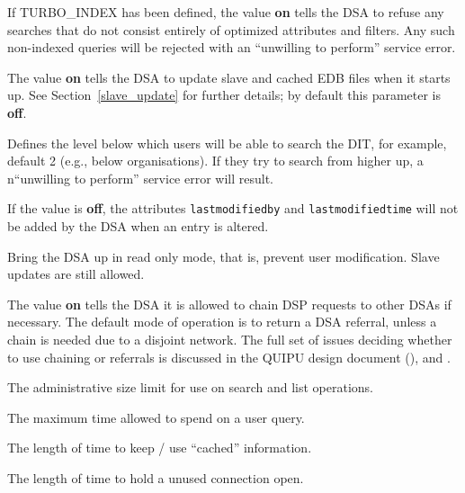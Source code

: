 \begin{describe}
\item [\verb"optimized\_only":]
If TURBO\_INDEX has been defined, the value {\bf on}
tells the DSA to refuse any searches that do not consist entirely of 
optimized attributes and filters.  Any such non-indexed queries
will be rejected with an ``unwilling to perform'' service error.

\item [\verb"update":]
The value {\bf on} tells the DSA to update slave and cached EDB files 
when it starts up.
See Section~\ref{slave_update} for further details; by default 
this parameter is {\bf off}.

\item [\verb"searchlevel":] Defines the level below which users will be able
to search the DIT, for example, default 2 (e.g., below organisations).
If they try to search from higher up, a n``unwilling to perform'' service
error will result.

\item [\verb"lastmodified":] If the value is {\bf off}, 
the attributes \verb+lastmodifiedby+ and  
\verb+lastmodifiedtime+
will not be added by the DSA when an entry is altered.

\item[\verb"readonly":] Bring the DSA up in read only mode, that is,
prevent user modification.  Slave updates are still allowed.

\item [\verb"dspchaining":]
\label{dspchain}
The value {\bf on} tells the DSA it is allowed to chain DSP 
requests to other DSAs 
if necessary.
The default mode of operation is to return a DSA referral, unless a
chain is needed due to a disjoint network.
The full set of issues deciding whether to use chaining or referrals
is discussed in the QUIPU design document (\cite{QUIPU.Design}), and 
\cite{QUIPU.Navigate}.

\item [\verb"adminsize":] The administrative size limit for use on search
and list operations.

\item[\verb"admintime":] The maximum time allowed to spend on a user query.

\item[\verb"cachetime":] The length of time to keep / use ``cached''
information.

\item[\verb"conntime":] The length of time to hold a unused connection open.


\end{describe}
